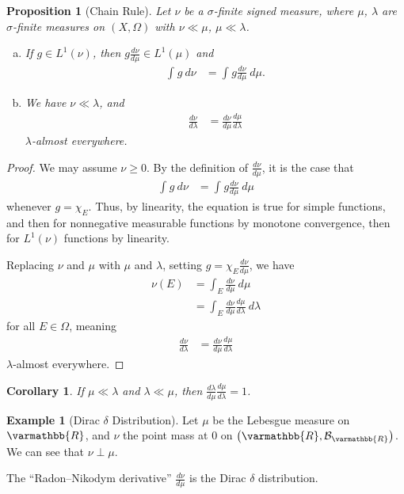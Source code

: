 \documentclass[12pt]{extarticle}
\newcommand{\R}{\mathbb{R}}
\theoremstyle{plain}
\newtheorem*{corollary}{Corollary}
\newtheorem*{proposition}{Proposition}
\theoremstyle{definition}
\newtheorem*{example}{Example}
\theoremstyle{note}
\renewcommand*{\mathbb}[1]{\varmathbb{#1}}
\renewcommand{\newline}{\hfill\break}
\begin{document}
\begin{proposition}[Chain Rule]
  Let $\nu$ be a $\sigma$-finite signed measure, where $\mu$, $\lambda$ are $\sigma$-finite measures on $(X,\Omega)$ with $\nu \ll \mu$, $\mu \ll \lambda$.
  \begin{enumerate}[(a)]
    \item If $g \in L^{1}\left(\nu\right)$, then $g\frac{d\nu}{d\mu}\in L^1\left(\mu\right)$ and
      \begin{align*}
        \int_{}^{} g\:d\nu &= \int_{}^{} g\frac{d\nu}{d\mu}\:d\mu.
      \end{align*}
    \item We have $\nu \ll \lambda$, and
      \begin{align*}
        \frac{d\nu}{d\lambda} &= \frac{d\nu}{d\mu}\frac{d\mu}{d\lambda}
      \end{align*}
      $\lambda$-almost everywhere.
  \end{enumerate}
\end{proposition}
\begin{proof}
  We may assume $\nu \geq 0$. By the definition of $\frac{d\nu}{d\mu}$, it is the case that
  \begin{align*}
    \int_{}^{} g\:d\nu &= \int_{}^{} g\frac{d\nu}{d\mu}\:d\mu
  \end{align*}
  whenever $g = \chi_E$. Thus, by linearity, the equation is true for simple functions, and then for nonnegative measurable functions by monotone convergence, then for $L^{1}(\nu)$ functions by linearity.\newline

  Replacing $\nu$ and $\mu$ with $\mu$ and $\lambda$, setting $g = \chi_E \frac{d\nu}{d\mu}$, we have
  \begin{align*}
    \nu(E) &= \int_{E}^{} \frac{d\nu}{d\mu}\:d\mu\\
           &= \int_{E}^{} \frac{d\nu}{d\mu}\frac{d\mu}{d\lambda}\:d\lambda
  \end{align*}
  for all $E\in \Omega$, meaning
  \begin{align*}
    \frac{d\nu}{d\lambda} &= \frac{d\nu}{d\mu}\frac{d\mu}{d\lambda}
  \end{align*}
  $\lambda$-almost everywhere.
\end{proof}
\begin{corollary}
  If $\mu \ll \lambda$ and $\lambda \ll \mu$, then $\frac{d\lambda}{d\mu}\frac{d\mu}{d\lambda} = 1$.
\end{corollary}
\begin{example}[Dirac $\delta$ Distribution]
  Let $\mu$ be the Lebesgue measure on $\R$, and $\nu$ the point mass at $0$ on $\left(\R,\mathcal{B}_{\R}\right)$. We can see that $\nu \perp \mu$.\newline

  The ``Radon--Nikodym derivative'' $\frac{d\nu}{d\mu}$ is the Dirac $\delta$ distribution.
\end{example}
\end{document}
